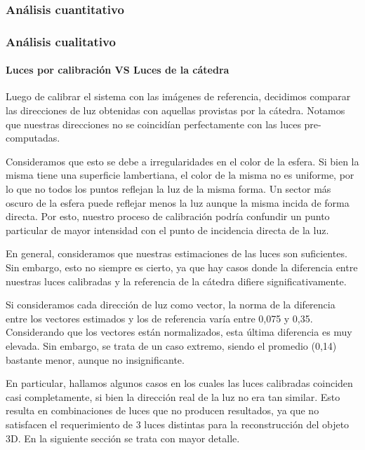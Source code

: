 \subsubsection{Análisis cuantitativo}



\subsubsection{Análisis cualitativo}

\paragraph{Luces por calibración VS Luces de la cátedra}

Luego de calibrar el sistema con las imágenes de referencia, decidimos comparar
las direcciones de luz obtenidas con aquellas provistas por la cátedra. Notamos
que nuestras direcciones no se coincidían perfectamente con las luces pre-computadas.

Consideramos que esto se debe a irregularidades en el color de la esfera. Si bien la misma
tiene una superficie lambertiana, el color de la misma no es uniforme, por lo que no
todos los puntos reflejan la luz de la misma forma. Un sector más oscuro de la esfera
puede reflejar menos la luz aunque la misma incida de forma directa. Por esto, nuestro proceso
de calibración podría confundir un punto particular de mayor intensidad con el punto de
incidencia directa de la luz.

En general, consideramos que nuestras estimaciones de las luces son suficientes.
Sin embargo, esto no siempre es cierto, ya que hay casos donde la diferencia
entre nuestras luces calibradas y la referencia de la cátedra difiere significativamente.

Si consideramos cada dirección de luz como vector, la norma de la diferencia
entre los vectores estimados y los de referencia varía entre 0,075 y 0,35.
Considerando que los vectores están normalizados, esta última diferencia es muy elevada.
Sin embargo, se trata de un caso extremo, siendo el promedio (0,14)
bastante menor, aunque no insignificante.

En particular, hallamos algunos casos en los cuales las luces calibradas coinciden casi
completamente, si bien la dirección real de la luz no era tan similar. Esto resulta en
combinaciones de luces que no producen resultados, ya que no satisfacen el
requerimiento de 3 luces distintas para la reconstrucción del objeto 3D.
En la siguiente sección se trata con mayor detalle.

